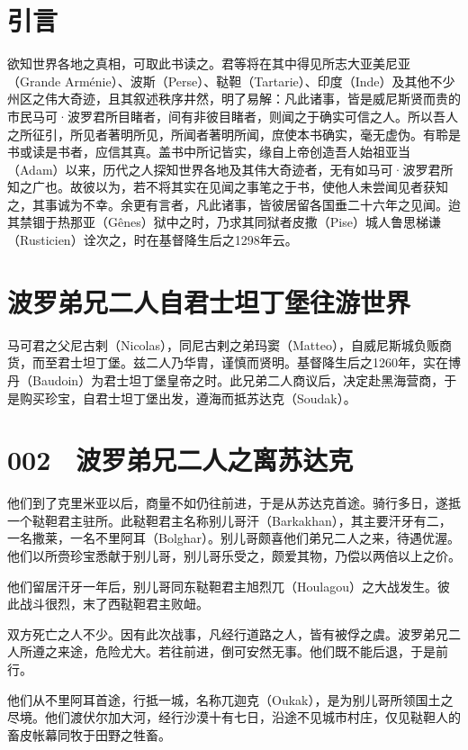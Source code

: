 \documentclass[12pt,UTF8]{ctexbook}
\begin{document}
\mainmatter

\chapter{引言}

欲知世界各地之真相，可取此书读之。君等将在其中得见所志大亚美尼亚（Grande Arménie）、波斯（Perse）、鞑靼（Tartarie）、印度（Inde）及其他不少州区之伟大奇迹，且其叙述秩序井然，明了易解：凡此诸事，皆是威尼斯贤而贵的市民马可·波罗君所目睹者，间有非彼目睹者，则闻之于确实可信之人。所以吾人之所征引，所见者著明所见，所闻者著明所闻，庶使本书确实，毫无虚伪。有聆是书或读是书者，应信其真。盖书中所记皆实，缘自上帝创造吾人始祖亚当（Adam）以来，历代之人探知世界各地及其伟大奇迹者，无有如马可·波罗君所知之广也。故彼以为，若不将其实在见闻之事笔之于书，使他人未尝闻见者获知之，其事诚为不幸。余更有言者，凡此诸事，皆彼居留各国垂二十六年之见闻。迨其禁锢于热那亚（Gênes）狱中之时，乃求其同狱者皮撒（Pise）城人鲁思梯谦（Rusticien）诠次之，时在基督降生后之1298年云。

\chapter{波罗弟兄二人自君士坦丁堡往游世界}

马可君之父尼古剌（Nicolas），同尼古剌之弟玛窦（Matteo），自威尼斯城负贩商货，而至君士坦丁堡。兹二人乃华胄，谨慎而贤明。基督降生后之1260年，实在博丹（Baudoin）为君士坦丁堡皇帝之时。此兄弟二人商议后，决定赴黑海营商，于是购买珍宝，自君士坦丁堡出发，遵海而抵苏达克（Soudak）。

\chapter{002　波罗弟兄二人之离苏达克}

他们到了克里米亚以后，商量不如仍往前进，于是从苏达克首途。骑行多日，遂抵一个鞑靼君主驻所。此鞑靼君主名称别儿哥汗（Barkakhan），其主要汗牙有二，一名撒莱，一名不里阿耳（Bolghar）。别儿哥颇喜他们弟兄二人之来，待遇优渥。他们以所赍珍宝悉献于别儿哥，别儿哥乐受之，颇爱其物，乃偿以两倍以上之价。

他们留居汗牙一年后，别儿哥同东鞑靼君主旭烈兀（Houlagou）之大战发生。彼此战斗很烈，末了西鞑靼君主败衄。

双方死亡之人不少。因有此次战事，凡经行道路之人，皆有被俘之虞。波罗弟兄二人所遵之来途，危险尤大。若往前进，倒可安然无事。他们既不能后退，于是前行。

他们从不里阿耳首途，行抵一城，名称兀迦克（Oukak），是为别儿哥所领国土之尽境。他们渡伏尔加大河，经行沙漠十有七日，沿途不见城市村庄，仅见鞑靼人的畜皮帐幕同牧于田野之牲畜。
\end{document}
